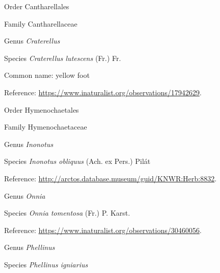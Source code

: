 \documentclass[9pt, article]{memoir}
\begin{document}
\begin{multicols}{2}
\vspace{6pt}\noindent\hspace{18pt}Order Cantharellales


\vspace{6pt}\noindent\hspace{24pt}Family Cantharellaceae


\vspace{6pt}\noindent\hspace{30pt}Genus \textit{Craterellus}


\vspace{6pt}\noindent\hspace{36pt}Species \textit{Craterellus lutescens} (Fr.) Fr.


Common name: yellow foot

Reference: 
\url{https://www.inaturalist.org/observations/17942629}.

\vspace{6pt}\noindent\hspace{18pt}Order Hymenochaetales


\vspace{6pt}\noindent\hspace{24pt}Family Hymenochaetaceae


\vspace{6pt}\noindent\hspace{30pt}Genus \textit{Inonotus}


\vspace{6pt}\noindent\hspace{36pt}Species \textit{Inonotus obliquus} (Ach. ex Pers.) Pilát


Reference: 
\url{http://arctos.database.museum/guid/KNWR:Herb:8832}.

\vspace{6pt}\noindent\hspace{30pt}Genus \textit{Onnia}


\vspace{6pt}\noindent\hspace{36pt}Species \textit{Onnia tomentosa} (Fr.) P. Karst.


Reference: 
\url{https://www.inaturalist.org/observations/30460056}.

\vspace{6pt}\noindent\hspace{30pt}Genus \textit{Phellinus}


\vspace{6pt}\noindent\hspace{36pt}Species \textit{Phellinus igniarius}



\end{multicols}
\end{document}
